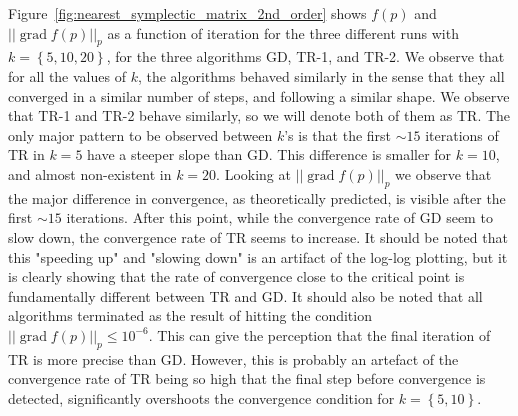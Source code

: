 Figure~\ref{fig:nearest_symplectic_matrix_2nd_order} shows $f(p)$ and $\lvert \lvert \operatorname{grad}f(p) \rvert \rvert_{p}$ as a function of iteration for the three different runs with $k=\left\{ 5,10,20 \right\}$, for the three algorithms GD, TR-1, and TR-2. We observe that for all the values of $k$, the algorithms behaved similarly in the sense that they all converged in a similar number of steps, and following a similar shape. We observe that TR-1 and TR-2 behave  similarly, so we will denote both of them as TR. The only major pattern to be observed between $k$'s is that the first $\sim 15$ iterations of TR in $k=5$ have a steeper slope than GD. This difference is smaller for $k=10$, and almost non-existent in $k=20$. Looking at $\lvert \lvert \operatorname{grad}f(p) \rvert \rvert_{p}$ we observe that the major difference in convergence, as theoretically predicted, is visible after the first $\sim 15$ iterations. After this point, while the convergence rate of GD seem to slow down, the convergence rate of TR seems to increase. It should be noted that this "speeding up" and "slowing down" is an artifact of the log-log plotting, but it is clearly showing that the rate of convergence close to the critical point is fundamentally different between TR and GD. It should also be noted that all algorithms terminated as the result of hitting the condition $\lvert \lvert \operatorname{grad}f(p) \rvert \rvert_{p}\leq10^{-6}$. This can give the perception that the final iteration of TR is more precise than GD. However, this is probably an artefact of the convergence rate of TR being so high that the final step before convergence is detected, significantly overshoots the convergence condition for $k=\left\{ 5,10 \right\}$. 

